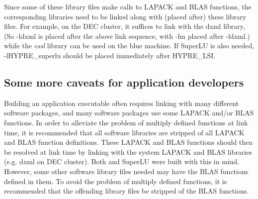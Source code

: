 Since some of these library files make calls to LAPACK and BLAS functions, 
the corresponding libraries need to be linked along with (placed after) these 
library files.  For example, on the DEC cluster, it suffices to link
with the {\sf dxml} library, (So {\sf -ldxml} is placed after the above link
sequence, with {\sf -lm} placed after {\sf -ldxml}.) while the {\it essl}
library can be used on the blue machine. If {\sf SuperLU} is also needed,
{\sf -lHYPRE\_superlu} should be placed immediately after {\sf HYPRE\_LSI}.

\subsection{Some more caveats for application developers}

Building an application executable often requires linking with many different
software packages, and many software packages use some LAPACK and/or BLAS
functions.  In order to alleviate the problem of multiply defined functions
at link time, it is recommended that all software libraries are stripped of
all LAPACK and BLAS function definitions.  These LAPACK and BLAS functions 
should then be resolved at link time by linking with the system LAPACK and
BLAS libraries (e.g. dxml on DEC cluster).  Both \hypre{} and SuperLU were
built with this in mind.  However, some other software library files needed
may have the BLAS functions defined in them.  To avoid the problem of
multiply defined functions, it is recommended that the offending library
files be stripped of the BLAS functions.




